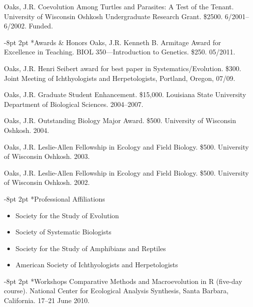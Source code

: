 \documentclass[10pt]{article}
\makeatletter
\renewcommand{\section}{\@startsection{section}{1}{0mm}%
    {-8pt}%
    {2pt}%
   {\bfseries\large}}
\newenvironment{myItemize}{
  \begin{itemize}
    \setlength{\leftskip}{-5mm}
    \setlength{\itemsep}{1pt}
    \setlength{\parskip}{0pt}
    \setlength{\parsep}{0pt}}
  {\end{itemize}}
\makeatother
\begin{document}
\hangindent=5mm
Oaks, J.R.
Coevolution Among Turtles and Parasites: A Test of the Tenant.
University of Wisconsin Oshkosh Undergraduate Research Grant.
\$2500.
6/2001--6/2002.
Funded.

\section*{Awards \& Honors}
\hangindent=5mm
Oaks, J.R.
Kenneth B. Armitage Award for Excellence in Teaching.
BIOL 350---Introduction to Genetics.
\$250.
05/2011.

\hangindent=5mm
Oaks, J.R.
Henri Seibert award for best paper in Systematics/Evolution.
\$300.
Joint Meeting of Ichthyologists and Herpetologists, Portland, Oregon, 07/09.

\hangindent=5mm
Oaks, J.R.
Graduate Student Enhancement.
\$15,000.
Louisiana State University Department of Biological Sciences.
2004--2007.

\hangindent=5mm
Oaks, J.R.
Outstanding Biology Major Award.
\$500.
University of Wisconsin Oshkosh.
2004.

\hangindent=5mm
Oaks, J.R.
Leslie-Allen Fellowship in Ecology and Field Biology.
\$500.
University of Wisconsin Oshkosh.
2003.

\hangindent=5mm
Oaks, J.R.
Leslie-Allen Fellowship in Ecology and Field Biology.
\$500.
University of Wisconsin Oshkosh.
2002.

\section*{Professional Affiliations}
\begin{myItemize}
\item Society for the Study of Evolution
\item Society of Systematic Biologists
\item Society for the Study of Amphibians and Reptiles
\item American Society of Ichthyologists and Herpetologists
\end{myItemize}

\section*{Workshops}
\hangindent=5mm
Comparative Methods and Macroevolution in R (five-day course).
National Center for Ecological Analysis Synthesis, Santa Barbara, California.
17--21 June 2010.
\end{document}
